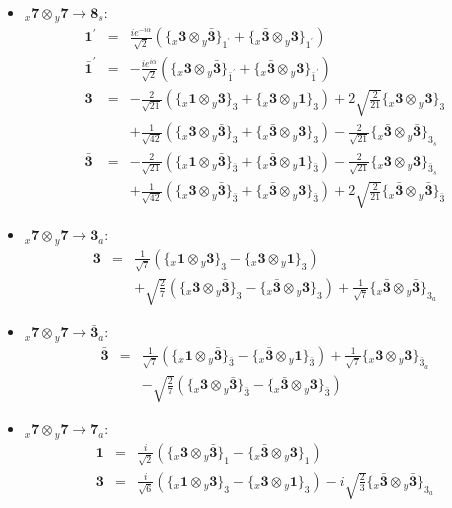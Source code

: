 \documentclass[english]{article}
\newcommand{\rep}[1]{\mathbf{#1}}
\newcommand{\repx}[2]{{}_{#2}\mathbf{#1}}
\newcommand{\subcg}[3]{\big\{ \repx{#1}{x}\otimes\repx{#2}{y}\big\}^{}_{#3}}
\begin{document}
\begin{itemize}
\begin{eqnarray*}
\end{eqnarray*}
\item $\repx{7}{x}\otimes\repx{7}{y}\to\rep{8}_{s}$:
\begin{eqnarray*}
\rep{1^{\prime}} &=& \frac{i e^{-i \alpha }}{\sqrt{2}}\left(\subcg{3}{\bar{3}}{1^{\prime}}+\subcg{\bar{3}}{3}{1^{\prime}}\right)
\\
\rep{\bar{1}^{\prime}} &=& -\frac{i e^{i \alpha }}{\sqrt{2}}\left(\subcg{3}{\bar{3}}{\bar{1}^{\prime}}+\subcg{\bar{3}}{3}{\bar{1}^{\prime}}\right)
\\
\rep{3} &=& -\frac{2}{\sqrt{21}}\left(\subcg{1}{3}{3}+\subcg{3}{1}{3}\right)+2 \sqrt{\frac{2}{21}}\subcg{3}{3}{3} \\ 
 & & +\frac{1}{\sqrt{42}}\left(\subcg{3}{\bar{3}}{3}+\subcg{\bar{3}}{3}{3}\right)-\frac{2}{\sqrt{21}}\subcg{\bar{3}}{\bar{3}}{3_{s}}
\\
\rep{\bar{3}} &=& -\frac{2}{\sqrt{21}}\left(\subcg{1}{\bar{3}}{\bar{3}}+\subcg{\bar{3}}{1}{\bar{3}}\right)-\frac{2}{\sqrt{21}}\subcg{3}{3}{\bar{3}_{s}} \\ 
 & & +\frac{1}{\sqrt{42}}\left(\subcg{3}{\bar{3}}{\bar{3}}+\subcg{\bar{3}}{3}{\bar{3}}\right)+2 \sqrt{\frac{2}{21}}\subcg{\bar{3}}{\bar{3}}{\bar{3}}
\end{eqnarray*}
\item $\repx{7}{x}\otimes\repx{7}{y}\to\rep{3}_{a}$:
\begin{eqnarray*}
\rep{3} &=& \frac{1}{\sqrt{7}}\left(\subcg{1}{3}{3}-\subcg{3}{1}{3}\right) \\ 
 & & +\sqrt{\frac{2}{7}}\left(\subcg{3}{\bar{3}}{3}-\subcg{\bar{3}}{3}{3}\right)+\frac{1}{\sqrt{7}}\subcg{\bar{3}}{\bar{3}}{3_{a}}
\end{eqnarray*}
\item $\repx{7}{x}\otimes\repx{7}{y}\to\rep{\bar{3}}_{a}$:
\begin{eqnarray*}
\rep{\bar{3}} &=& \frac{1}{\sqrt{7}}\left(\subcg{1}{\bar{3}}{\bar{3}}-\subcg{\bar{3}}{1}{\bar{3}}\right)+\frac{1}{\sqrt{7}}\subcg{3}{3}{\bar{3}_{a}} \\ 
 & & -\sqrt{\frac{2}{7}}\left(\subcg{3}{\bar{3}}{\bar{3}}-\subcg{\bar{3}}{3}{\bar{3}}\right)
\end{eqnarray*}
\item $\repx{7}{x}\otimes\repx{7}{y}\to\rep{7}_{a}$:
\begin{eqnarray*}
\rep{1} &=& \frac{i}{\sqrt{2}}\left(\subcg{3}{\bar{3}}{1}-\subcg{\bar{3}}{3}{1}\right)
\\
\rep{3} &=& \frac{i}{\sqrt{6}}\left(\subcg{1}{3}{3}-\subcg{3}{1}{3}\right)-i \sqrt{\frac{2}{3}}\subcg{\bar{3}}{\bar{3}}{3_{a}}

\end{eqnarray*}
\end{itemize}
\end{document}
